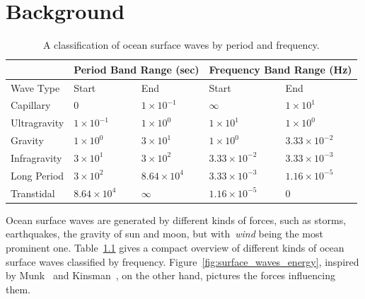 \newcommand{\mvec}[1]{\mathbf{#1}}
\newcommand{\mvecx}[1]{\mathbf{#1}_x}
\newcommand{\mvecy}[1]{\mathbf{#1}_y}
\newcommand{\mvecz}[1]{\mathbf{#1}_z}
\newcommand{\mvecw}[1]{\mathbf{#1}_w}
\newcommand{\mmat}[1]{\mathbf{#1}}
\newcommand{\transpose}[1]{#1^{\mathsf{T}}}
\newcommand{\inverse}[1]{#1^{\mathsf{-1}}}
\newcommand{\normalise}[1]{\frac{#1}{\norm{#1}}}

\DeclarePairedDelimiter\abs{\lvert}{\rvert}
\DeclarePairedDelimiter\norm{\lVert}{\rVert}


\renewcommand{\Re}{\mathcal{R}}
\renewcommand{\Im}{\mathcal{I}} 
%
\chapter{Background}
\label{ch:background}
%
\begin{table}[b]
\begin{tabularx}{\textwidth}{X | X X | X X }
  \cline{2-5}
  & \multicolumn{2}{c}{Period Band Range (sec)} \vline & \multicolumn{2}{c}{Frequency Band Range (Hz)} \\
  \hline
  Wave Type & Start & End & Start & End \\
 \hline
  Capillary    & $0$                & $1\times10^{-1}$   & $\infty$            & $1\times10^1$ \\
  Ultragravity & $1\times10^{-1}$   & $1\times10^{0}$    & $1\times10^1$       & $1\times10^0$ \\
  Gravity      & $1\times10^{0}$    & $3\times10^{1}$    & $1\times10^0$       & $3.33\times10^{-2}$ \\
  Infragravity & $3\times10^{1}$    & $3\times10^{2}$    & $3.33\times10^{-2}$ & $3.33\times10^{-3}$ \\
  Long Period  & $3\times10^{2}$    & $8.64\times10^{4}$ & $3.33\times10^{-3}$ & $1.16\times10^{-5}$ \\
  Transtidal   & $8.64\times10^{4}$ & $\infty$           & $1.16\times10^{-5}$ & $0$
\end{tabularx}
\caption{A classification of ocean surface waves by period and frequency.}
\label{tab:ocean_wave_period}
\end{table}

Ocean surface waves are generated by different kinds of forces, such as storms, earthquakes,
the gravity of sun and moon, but with~\emph{wind} being the most prominent one.
Table~\ref{tab:ocean_wave_period} gives a compact overview of different kinds of ocean surface waves
classified by frequency. Figure~\ref{fig:surface_waves_energy}, inspired by Munk~\cite{article:munkorigin}
and Kinsman~\cite{book:kinsman2002wind}, on the other hand, pictures the forces
influencing them.\\

